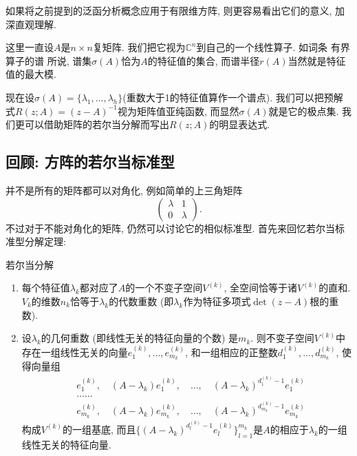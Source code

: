 

如果将之前提到的泛函分析概念应用于有限维方阵, 则更容易看出它们的意义, 加深直观理解. 

这里一直设$A$是$n\times n$复矩阵. 我们把它视为$\mathbb{C}^n$到自己的一个线性算子. 如词条 有界算子的谱 所说, 谱集$\sigma(A)$恰为$A$的特征值的集合, 而谱半径$r(A)$当然就是特征值的最大模. 

现在设$\sigma(A)=\{\lambda_1,...,\lambda_h\}$(重数大于1的特征值算作一个谱点). 我们可以把预解式$R(z;A)=(z-A)^{-1}$视为矩阵值亚纯函数, 而显然$\sigma(A)$就是它的极点集. 我们更可以借助矩阵的若尔当分解而写出$R(z;A)$的明显表达式. 

\subsection{回顾: 方阵的若尔当标准型}
并不是所有的矩阵都可以对角化, 例如简单的上三角矩阵
$$
\left(
\begin{matrix}
\lambda & 1 \\
0 & \lambda
\end{matrix}
\right).
$$
不过对于不能对角化的矩阵, 仍然可以讨论它的相似标准型. 首先来回忆若尔当标准型分解定理:

\begin{theorem}{若尔当分解}
\begin{enumerate}
\item 每个特征值$\lambda_k$都对应了$A$的一个不变子空间$V^{(k)}$, 全空间恰等于诸$V^{(k)}$的直和. $V_k$的维数$n_k$恰等于$\lambda_k$的代数重数 (即$\lambda_k$作为特征多项式$\det(z-A)$根的重数).
\item 设$\lambda_k$的几何重数 (即线性无关的特征向量的个数) 是$m_k$. 则不变子空间$V^{(k)}$中存在一组线性无关的向量$e^{(k)}_1,...,e^{(k)}_{m_k}$, 和一组相应的正整数$d^{(k)}_1,...,d^{(k)}_{m_k}$, 使得向量组
$$
\begin{aligned}
&e^{(k)}_1,\quad(A-\lambda_k)e^{(k)}_1,\quad...,\quad(A-\lambda_k)^{d^{(k)}_1-1}e^{(k)}_1\\
&......\\
&e^{(k)}_{m_k},\quad(A-\lambda_k)e^{(k)}_{m_k},\quad...,\quad(A-\lambda_k)^{d^{(k)}_{m_k}-1}e^{(k)}_{m_k}
\end{aligned}
$$
构成$V^{(k)}$的一组基底, 而且$\{(A-\lambda_k)^{d^{(k)}_l-1}e^{(k)}_l\}_{l=1}^{m_k}$是$A$的相应于$\lambda_k$的一组线性无关的特征向量.
\end{enumerate}
\end{theorem}

